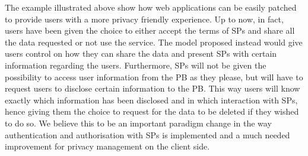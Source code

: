 The example illustrated above show how web applications can be easily patched to provide users with a more privacy friendly experience. Up to now, in fact, users have been given the choice to either accept the terms of SPs and share all the data requested or not use the service. The model proposed instead would give users control on how they can share the data and present SPs with certain information regarding the users. 
Furthermore, SPs will not be given the possibility to access user information from the PB as they please, but will have to request users to disclose certain information to the PB. This way users will know exactly which information has been disclosed and in which interaction with SPs, hence giving them the choice to request for the data to be deleted if they wished to do so.
We believe this to be an important paradigm change in the way authentication and authorisation with SPs is implemented and a much needed improvement for privacy management on the client side.
